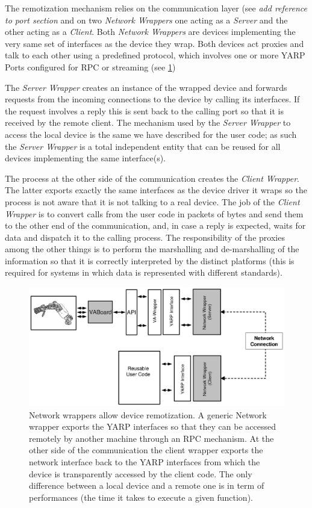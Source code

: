 The remotization mechanism relies on the communication layer (see \emph{add 
reference to port section} and on two \emph{Network Wrappers} one acting 
as a \emph{Server} and the other acting as a \emph{Client}. 
Both \emph{Network Wrappers} are devices implementing the very same set 
of interfaces as the device they wrap. Both devices act proxies and talk 
to each other using a predefined protocol, which involves one or more 
YARP Ports configured for RPC or streaming (see \ref{fig:devices3})

The \emph{Server Wrapper} creates an instance of the wrapped device and 
forwards requests from the incoming connections to the device by calling 
its interfaces. If the request involves a reply this is sent back to the 
calling port so that it is received by the remote client. The mechanism 
used by the \emph{Server Wrapper} to access the local device is the same 
we have described for the user code; as 
such the \emph{Server Wrapper} is a total independent entity that can be 
reused for all devices implementing the same interface(s). 

The process at the other side of the communication creates the 
\emph{Client Wrapper}. The latter exports exactly the same interfaces as the 
device driver it wraps so the process is not aware that it is not talking to 
a real device. The job of the \emph{Client Wrapper} is to convert calls from 
the user code in packets of bytes and send them to the other end of the 
communication, and, in case a reply is expected, waits for data and dispatch 
it to the calling process. The responsibility of the proxies among the other 
things is to perform the marshalling and de-marshalling of the information 
so that it is correctly interpreted by the distinct platforms (this is 
required for systems in which data is represented with different standards).

\begin{figure}[tbp]
\centerline{
\includegraphics[width=24cm]{fig-devices3}
}
\caption{Network wrappers allow device remotization. A generic Network 
wrapper exports the YARP interfaces so that they can be accessed remotely 
by another machine through an RPC mechanism. At the other side of the 
communication the client wrapper exports the network interface back 
to the YARP interfaces from which the device is transparently accessed 
by the client code. The only difference between a local device and a 
remote one is in term of performances (the time it takes to execute 
a given function).
}\label{fig:devices3}
\end{figure}

